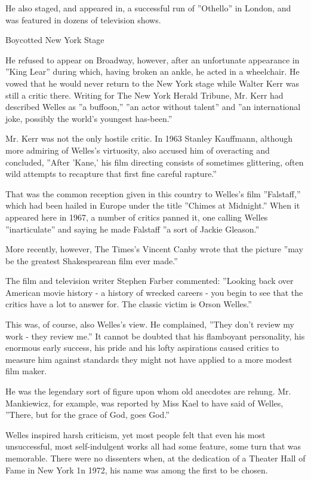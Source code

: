He also staged, and appeared in, a successful run of ''Othello'' in
London, and was featured in dozens of television shows.

Boycotted New York Stage

He refused to appear on Broadway, however, after an unfortunate
appearance in ''King Lear'' during which, having broken an ankle, he
acted in a wheelchair. He vowed that he would never return to the New
York stage while Walter Kerr was still a critic there. Writing for The
New York Herald Tribune, Mr. Kerr had described Welles as ''a buffoon,''
''an actor without talent'' and ''an international joke, possibly the
world's youngest has-been.''

Mr. Kerr was not the only hostile critic. In 1963 Stanley Kauffmann,
although more admiring of Welles's virtuosity, also accused him of
overacting and concluded, ''After 'Kane,' his film directing consists of
sometimes glittering, often wild attempts to recapture that first fine
careful rapture.''

That was the common reception given in this country to Welles's film
''Falstaff,'' which had been hailed in Europe under the title ''Chimes
at Midnight.'' When it appeared here in 1967, a number of critics panned
it, one calling Welles ''inarticulate'' and saying he made Falstaff ''a
sort of Jackie Gleason.''

More recently, however, The Times's Vincent Canby wrote that the picture
''may be the greatest Shakespearean film ever made.''

The film and television writer Stephen Farber commented: ''Looking back
over American movie history - a history of wrecked careers - you begin
to see that the critics have a lot to answer for. The classic victim is
Orson Welles.''

This was, of course, also Welles's view. He complained, ''They don't
review my work - they review me.'' It cannot be doubted that his
flamboyant personality, his enormous early success, his pride and his
lofty aspirations caused critics to measure him against standards they
might not have applied to a more modest film maker.

He was the legendary sort of figure upon whom old anecdotes are rehung.
Mr. Mankiewicz, for example, was reported by Miss Kael to have said of
Welles, ''There, but for the grace of God, goes God.''

Welles inspired harsh criticism, yet most people felt that even his most
unsuccessful, most self-indulgent works all had some feature, some turn
that was memorable. There were no dissenters when, at the dedication of
a Theater Hall of Fame in New York 1n 1972, his name was among the first
to be chosen.

